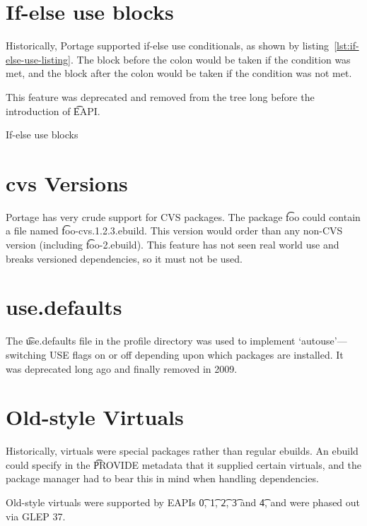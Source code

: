 \section{If-else use blocks}

Historically, Portage supported if-else use conditionals, as shown by
listing~\ref{lst:if-else-use-listing}. The block before the colon would be taken if the condition
was met, and the block after the colon would be taken if the condition was not met.

This feature was deprecated and removed from the tree long before the introduction of \t{EAPI}.

\begin{listing}
  \caption{If-else use blocks}\label{lst:if-else-use-listing}
  
\end{listing}

\section{cvs Versions}

Portage has very crude support for CVS packages. The package \t{foo} could contain a file named
\t{foo-cvs.1.2.3.ebuild}. This version would order  than any non-CVS version (including
\t{foo-2.ebuild}). This feature has not seen real world use and breaks versioned dependencies, so
it must not be used.

\section{use.defaults}

The \t{use.defaults} file in the profile directory was used to implement `autouse'---switching USE
flags on or off depending upon which packages are installed. It was deprecated long ago and finally
removed in 2009.

\section{Old-style Virtuals}

Historically, virtuals were special packages rather than regular ebuilds. An ebuild could specify in
the \t{PROVIDE} metadata that it supplied certain virtuals, and the package manager had to bear this
in mind when handling dependencies.

Old-style virtuals were supported by EAPIs \t{0}, \t{1}, \t{2}, \t{3} and \t{4}, and were phased out
via GLEP 37.


